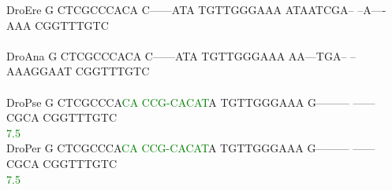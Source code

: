\documentclass[11pt,twoside,reqno,a4paper]{article}
\begin{document}
{DroEre	G	CTCGCCCACA	C------ATA	TGTTGGGAAA	ATAATCGA--	--A----AAA	CGGTTTGTC\\
\hspace*{7\charwidth}\hspace*{1\charwidth}\hspace*{1\charwidth}\hspace*{1\charwidth}\hspace*{1\charwidth}\hspace*{1\charwidth}\hspace*{1\charwidth}\\
DroAna	G	CTCGCCCACA	C------ATA	TGTTGGGAAA	AA---TGA--	--AAAGGAAT	CGGTTTGTC\\
\hspace*{7\charwidth}\hspace*{1\charwidth}\hspace*{1\charwidth}\hspace*{1\charwidth}\hspace*{1\charwidth}\hspace*{1\charwidth}\hspace*{1\charwidth}\\
DroPse	G	CTCGCCCA\textcolor{Green}{C}\textcolor{Green}{A}	\textcolor{Green}{C}\textcolor{Green}{C}\textcolor{Green}{G}\textcolor{Green}{-}\textcolor{Green}{C}\textcolor{Green}{A}\textcolor{Green}{C}\textcolor{Green}{A}\textcolor{Green}{T}A	TGTTGGGAAA	G---------	------CGCA	CGGTTTGTC\\
\hspace*{7\charwidth}\hspace*{1\charwidth}\hspace*{9\charwidth}\textcolor{Green}{7.5}\hspace*{1\charwidth}\hspace*{1\charwidth}\hspace*{1\charwidth}\hspace*{1\charwidth}\hspace*{1\charwidth}\\
DroPer	G	CTCGCCCA\textcolor{Green}{C}\textcolor{Green}{A}	\textcolor{Green}{C}\textcolor{Green}{C}\textcolor{Green}{G}\textcolor{Green}{-}\textcolor{Green}{C}\textcolor{Green}{A}\textcolor{Green}{C}\textcolor{Green}{A}\textcolor{Green}{T}A	TGTTGGGAAA	G---------	------CGCA	CGGTTTGTC\\
\hspace*{7\charwidth}\hspace*{1\charwidth}\hspace*{9\charwidth}\textcolor{Green}{7.5}\hspace*{1\charwidth}\hspace*{1\charwidth}\hspace*{1\charwidth}\hspace*{1\charwidth}\hspace*{1\charwidth}\\
}
\end{document}
